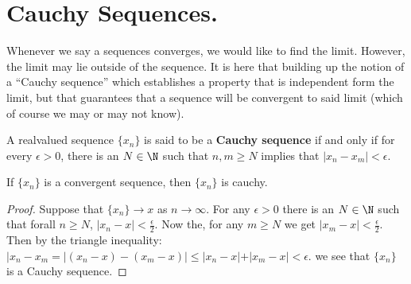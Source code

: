 
\section{Cauchy Sequences.}

Whenever we say a sequences converges, we would like to find the limit. However, 
the limit may lie outside of the sequence. It is here that building up the notion 
of a ``Cauchy sequence'' which establishes a property that is independent form 
the limit, but that guarantees that a sequence will be convergent to said limit 
(which of course we may or may not know).

\begin{definition}
    A realvalued sequence $\{x_n\}$ is said to be a \textbf{Cauchy sequence} 
    if and only if for every $\epsilon>0$, there is an  $N \in \N$ such that  
    $n, m \geq N$ implies that $|x_n-x_m|<\epsilon$.
\end{definition}

\begin{remark} 
    If $\{x_n\}$ is a convergent sequence, then  $\{x_n\}$ is cauchy.
\end{remark} 
\begin{proof}
    Suppose that $\{x_n\} \rightarrow x$ as  $n \rightarrow \infty$. For any  $\epsilon>0$  
    there is an $N \in \N$ such that forall  $n \geq N$,  $|x_n-x|<\frac{\epsilon}{2}$. 
    Now the, for any $m \geq N$ we get $|x_m-x|<\frac{\epsilon}{2}$. Then by the 
    triangle inequality: $|x_n-x_m=|(x_n-x)-(x_m-x)| \leq |x_n-x|+|x_m-x|<\epsilon$. 
    we see that $\{x_n\}$ is a Cauchy sequence.
\end{proof}

